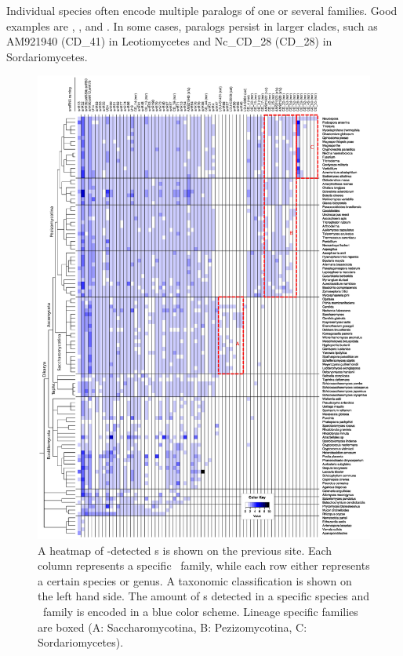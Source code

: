 Individual species often encode multiple paralogs of one or several
families. Good examples are \Ppl, \Asp, and \Nfu. In some cases,
paralogs persist in larger clades, such as AM921940 (CD\_41) in
Leotiomycetes and Nc\_CD\_28 (CD\_28) in Sordariomycetes.

\begin{figure}
  \vspace{-1cm}
  \centering
  \includegraphics[width=1.05\textwidth]{pics/CD_snoRNAs_collapsed.short_naming.rotated.eps}
  \caption{A heatmap of \snostrip-detected \cd s is shown on the
    previous site. Each column represents a specific \sno\ family,
    while each row either represents a certain species or genus. A
    taxonomic classification is shown on the left hand side. The
    amount of \sno s detected in a specific species and \sno\ family
    is encoded in a blue color scheme. Lineage specific families are
    boxed (A: Saccharomycotina, B: Pezizomycotina, C:
    Sordariomycetes). %
  }
  \label{fig:heatmap_CD_snoRNAs} 
\end{figure}

